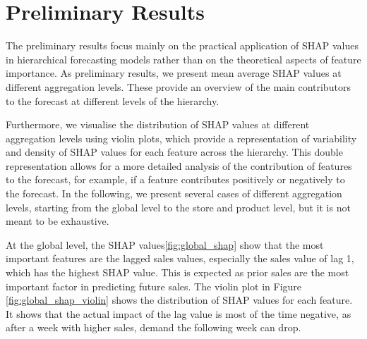 

\section{Preliminary Results}\label{sec:preliminary_results}

The preliminary results focus mainly on the practical application of SHAP values in hierarchical forecasting models
rather than on the theoretical aspects of feature importance.
As preliminary results, we present mean average SHAP values at different aggregation levels.
These provide an overview of the main contributors to the forecast at different levels of the hierarchy.

Furthermore, we visualise the distribution of SHAP values at different aggregation levels using violin plots,
which provide a representation of variability and density of SHAP values for each feature across the hierarchy.
This double representation allows for a more detailed analysis of the contribution of features to the forecast, for example,
if a feature contributes positively or negatively to the forecast.
In the following, we present several cases of different aggregation levels, starting from the global level to the store and product level,
but it is not meant to be exhaustive.


At the global level, the SHAP values\ref{fig:global_shap} show that the most important features are the lagged sales values, especially the sales value of lag 1, which has the highest SHAP value.
This is expected as prior sales are the most important factor in predicting future sales.
The violin plot in Figure \ref{fig:global_shap_violin} shows the distribution of SHAP values for each feature.
It shows that the actual impact of the lag value is most of the time negative,
as after a week with higher sales, demand the following week can drop.

